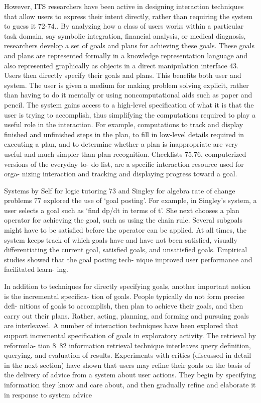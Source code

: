 However, ITS researchers have been active in designing interaction techniques that allow users to express their intent directly, rather than requiring the system to guess it 72-74.. By analyzing how a class of users works within a particular task domain, say symbolic integration, financial analysis, or medical diagnosis, researchers develop a set of goals and plans for achieving these goals. These goals and plans are represented formally in a knowledge representation language and also represented graphically as objects in a direct manipulation interface 43. Users then directly specify their goals and plans. This benefits both user and system. The user is given a medium for making problem solving explicit, rather than having to do it mentally or using noncomputational aids such as paper and pencil. The system gains access to a high-level specification of what it is that the user is trying to accomplish, thus simplifying the computations required to play a useful role in the interaction. For example, computations to track and display finished and unfinished steps in the plan, to fill in low-level details required in executing a plan, and to determine whether a plan is inappropriate are very useful and much simpler than plan recognition. Checklists 75,76, computerized versions of the everyday to- do list, are a specific interaction resource used for orga- nizing interaction and tracking and displaying progress toward a goal.

Systems by Self for logic tutoring 73 and Singley for
algebra rate of change problems 77 explored the use of `goal posting'. For example, in Singley's system, a user selects a goal such as `find dp/dt in terms of t'. She next chooses a plan operator for achieving the goal, such as using the chain rule. Several subgoals might have to be satisfied before the operator can be applied. At all times, the system keeps track of which goals have and have not been satisfied, visually differentiating the current goal, satisfied goals, and unsatisfied goals. Empirical studies showed that the goal posting tech- nique improved user performance and facilitated learn- ing.

In addition to techniques for directly specifying goals,
another important notion is the incremental specifica- tion of goals. People typically do not form precise defi- nitions of goals to accomplish, then plan to achieve their goals, and then carry out their plans. Rather, acting, planning, and forming and pursuing goals are interleaved. A number of interaction techniques have been explored that support incremental specification of goals in exploratory activity. The retrieval by reformula- tion 8~82 information retrieval technique interleaves query definition, querying, and evaluation of results. Experiments with critics (discussed in detail in the next section) have shown that users may refine their goals on the basis of the delivery of advice from a system about user actions. They begin by specifying information they know and care about, and then gradually refine and elaborate it in response to system advice


